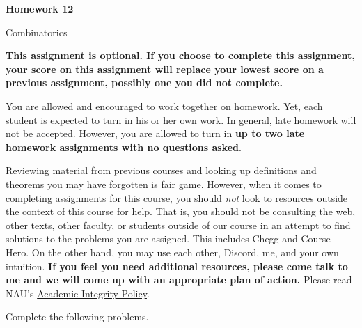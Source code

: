 \documentclass[11pt]{article}%
\theoremstyle{definition}
\newcommand{\blankline}{\pagebreak[2]\vspace{.5\baselineskip}}
\begin{document}
\begin{center}
{\Large\bf Homework 12}

\smallskip

Combinatorics
\end{center}

\thispagestyle{fancy}

\textbf{This assignment is optional. If you choose to complete this assignment, your score on this assignment will replace your lowest score on a previous assignment, possibly one you did not complete.}

\blankline

You are allowed and encouraged to work together on homework. Yet, each student is expected to turn in his or her own work. In general, late homework will not be accepted. However, you are allowed to turn in \textbf{up to two late homework assignments with no questions asked}. 

\blankline

Reviewing material from previous courses and looking up definitions and theorems you may have forgotten is fair game. However, when it comes to completing assignments for this course, you should \emph{not} look to resources outside the context of this course for help.  That is, you should not be consulting the web, other texts, other faculty, or students outside of our course in an attempt to find solutions to the problems you are assigned.  This includes Chegg and Course Hero. On the other hand, you may use each other, Discord, me, and your own intuition. \textbf{If you feel you need additional resources, please come talk to me and we will come up with an appropriate plan of action.} Please read NAU's \href{https://www5.nau.edu/policies/Client/Details/828?whoIsLooking=Students&pertainsTo=All&sortDirection=Ascending&page=1}{Academic Integrity Policy}.

\blankline

Complete the following problems. 
\end{document}
